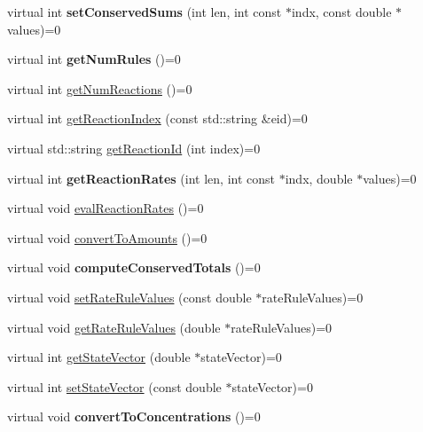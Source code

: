 \begin{DoxyCompactItemize}
\item 
\hypertarget{classrr_1_1_executable_model_adc8cb5d9f8cb8be0bc5ba4aaf082a55a}{virtual int {\bfseries set\-Conserved\-Sums} (int len, int const $\ast$indx, const double $\ast$values)=0}\label{classrr_1_1_executable_model_adc8cb5d9f8cb8be0bc5ba4aaf082a55a}

\item 
\hypertarget{classrr_1_1_executable_model_a8540961b62c8ad60ade60b77d1686f22}{virtual int {\bfseries get\-Num\-Rules} ()=0}\label{classrr_1_1_executable_model_a8540961b62c8ad60ade60b77d1686f22}

\item 
virtual int \hyperlink{classrr_1_1_executable_model_acb056a72125190c2abe39dba9c3600f1}{get\-Num\-Reactions} ()=0
\item 
virtual int \hyperlink{classrr_1_1_executable_model_a86fe96598b06cee5ca9a28dfdfd9d437}{get\-Reaction\-Index} (const std\-::string \&eid)=0
\item 
virtual std\-::string \hyperlink{classrr_1_1_executable_model_a230b955ef99e7616fb8d12c068b01f7b}{get\-Reaction\-Id} (int index)=0
\item 
\hypertarget{classrr_1_1_executable_model_ac814c5322dfcd876d0ffdcaa4eb88388}{virtual int {\bfseries get\-Reaction\-Rates} (int len, int const $\ast$indx, double $\ast$values)=0}\label{classrr_1_1_executable_model_ac814c5322dfcd876d0ffdcaa4eb88388}

\item 
virtual void \hyperlink{classrr_1_1_executable_model_a5e0e14f373b101b044559ec2c06a2a39}{eval\-Reaction\-Rates} ()=0
\item 
virtual void \hyperlink{classrr_1_1_executable_model_a119764cf63c094f8063ccac5f8190a80}{convert\-To\-Amounts} ()=0
\item 
\hypertarget{classrr_1_1_executable_model_a21fb68c451c822fa83c5b18a18ca4734}{virtual void {\bfseries compute\-Conserved\-Totals} ()=0}\label{classrr_1_1_executable_model_a21fb68c451c822fa83c5b18a18ca4734}

\item 
virtual void \hyperlink{classrr_1_1_executable_model_a2be036df6f2d85bb633e326c0e801f88}{set\-Rate\-Rule\-Values} (const double $\ast$rate\-Rule\-Values)=0
\item 
virtual void \hyperlink{classrr_1_1_executable_model_a8372872ec5858e91adc81080ad763c84}{get\-Rate\-Rule\-Values} (double $\ast$rate\-Rule\-Values)=0
\item 
virtual int \hyperlink{classrr_1_1_executable_model_a75b6f37ac538d2d2a0709fe4080b0570}{get\-State\-Vector} (double $\ast$state\-Vector)=0
\item 
virtual int \hyperlink{classrr_1_1_executable_model_a57a67063c957714b916d4a3d4277c3b9}{set\-State\-Vector} (const double $\ast$state\-Vector)=0
\item 
\hypertarget{classrr_1_1_executable_model_ad1e784a2f2f951fc1c74cde2ca26b893}{virtual void {\bfseries convert\-To\-Concentrations} ()=0}\label{classrr_1_1_executable_model_ad1e784a2f2f951fc1c74cde2ca26b893}


\end{DoxyCompactItemize}
